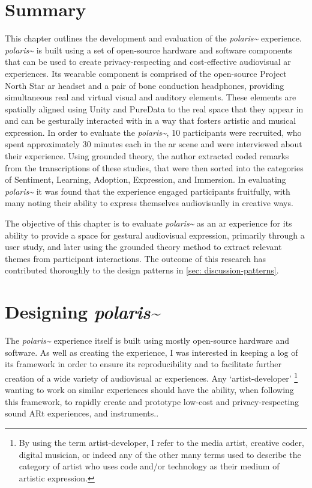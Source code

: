     
\clearpage
   
\section{Summary}\label{sec: polaris-summary}
This chapter outlines the development and evaluation of the \textit{polaris\textasciitilde{}} experience. \textit{polaris\textasciitilde{}} is built using a set of open-source hardware and software components that can be used to create privacy-respecting and cost-effective audiovisual \ac{ar} experiences. Its wearable component is comprised of the open-source Project North Star \ac{ar} headset and a pair of bone conduction headphones, providing simultaneous real and virtual visual and auditory elements. These elements are spatially aligned using Unity and PureData to the real space that they appear in and can be gesturally interacted with in a way that fosters artistic and musical expression. In order to evaluate the \textit{polaris\textasciitilde{}}, 10 participants were recruited, who spent approximately 30 minutes each in the \ac{ar} scene and were interviewed about their experience. Using grounded theory, the author extracted coded remarks from the transcriptions of these studies, that were then sorted into the categories of Sentiment, Learning, Adoption, Expression, and Immersion. In evaluating \textit{polaris\textasciitilde{}} it was found that the experience engaged participants fruitfully, with many noting their ability to express themselves audiovisually in creative ways.

The objective of this chapter is to evaluate \textit{polaris\textasciitilde{}} as an \ac{ar} experience for its ability to provide a space for gestural audiovisual expression, primarily through a user study, and later using the grounded theory method to extract relevant themes from participant interactions. The outcome of this research has contributed thoroughly to the design patterns in \autoref{sec: discussion-patterns}.



\section{Designing \textit{polaris\textasciitilde{}}}\label{sec: polaris-framework}
The \textit{polaris\textasciitilde{}} experience itself is built using mostly open-source hardware and software. As well as creating the experience, I was interested in keeping a log of its framework in order to ensure its reproducibility and to facilitate further creation of a wide variety of audiovisual \ac{ar} experiences. Any `artist-developer' \footnote{By using the term artist-developer, I refer to the media artist, creative coder, digital musician, or indeed any of the other many terms used to describe the category of artist who uses code and/or technology as their medium of artistic expression.} wanting to work on similar experiences should have the ability, when following this framework, to rapidly create and prototype low-cost and privacy-respecting sound ARt experiences, and instruments..

